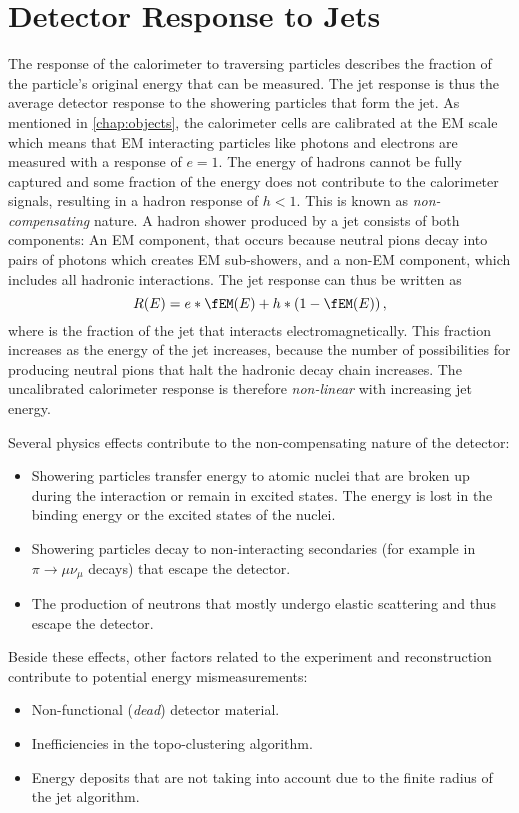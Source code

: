 \section{Detector Response to Jets}
The response of the calorimeter to traversing particles describes the fraction of the particle's original energy that can be measured. The jet response is thus the average detector response to the showering particles that form the jet.
As mentioned in \cref{chap:objects}, the calorimeter cells are calibrated at the EM scale which means that EM interacting particles like photons and electrons are measured with a response of $e = 1$. The energy of hadrons cannot be fully captured and some fraction of the energy does not contribute to the calorimeter signals, resulting in a hadron response of $h < 1$. This is known as \emph{non-compensating} nature.
A hadron shower produced by a jet consists of both components: 
An EM component, that occurs because neutral pions decay into pairs of photons which creates EM sub-showers, and a non-EM component, which includes all hadronic interactions. 
The jet response can thus be written as
\begin{equation}
    R(E) = e*\fEM(E) + h * \left(1 - \fEM(E)\right),
\end{equation}
where \fEM is the fraction of the jet that interacts electromagnetically. This fraction increases as the energy of the jet increases, because the number of possibilities for producing neutral pions that halt the hadronic decay chain increases. The uncalibrated calorimeter response is therefore \emph{non-linear} with increasing jet energy.

Several physics effects contribute to the non-compensating nature of the detector:
\begin{itemize}
    \item Showering particles transfer energy to atomic nuclei that are broken up during the interaction or remain in excited states. The energy is lost in the binding energy or the excited states of the nuclei.
    \item Showering particles decay to non-interacting secondaries (for example in $\pi \rightarrow \mu \nu_\mu$ decays) that escape the detector.
    \item The production of neutrons that mostly undergo elastic scattering and thus escape the detector.
\end{itemize}
Beside these effects, other factors related to the experiment and reconstruction contribute to potential energy mismeasurements:
\begin{itemize}
    \item Non-functional (\emph{dead}) detector material.
    \item Inefficiencies in the topo-clustering algorithm.
    \item Energy deposits that are not taking into account due to the finite radius of the jet algorithm.
\end{itemize}

